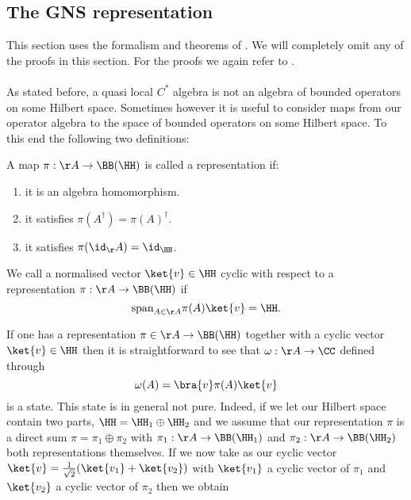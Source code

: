 \subsection{The GNS representation}\label{sec:the-gns-representation}
This section uses the formalism and theorems of \cite{bratteli1979operator}. We will completely omit any of the proofs in this section. For the proofs we again refer to \cite{bratteli1979operator}.\\\\
As stated before, a quasi local $C^*$ algebra is not an algebra of bounded operators on some Hilbert space. Sometimes however it is useful to consider maps from our operator algebra to the space of bounded operators on some Hilbert space. To this end the following two definitions:
\begin{definition}[representation]
	A map $\pi:\AA\rightarrow \BB(\HH)$ is called a representation if:
	\begin{enumerate}
		\item it is an algebra homomorphism.
		\item it satisfies $\pi(A^\dagger)=\pi(A)^\dagger$.
		\item it satisfies $\pi(\id_\AA)=\id_{\HH}$.
	\end{enumerate}
\end{definition}
\begin{definition}
	We call a normalised vector $\ket{v}\in\HH$ cyclic with respect to a representation $\pi:\AA\rightarrow \BB(\HH)$ if
	\begin{equation}
	\textrm{span}_{A\in\AA}\pi(A)\ket{v}=\HH.
	\end{equation}
\end{definition}
If one has a representation $\pi\in\AA\rightarrow\BB(\HH)$ together with a cyclic vector $\ket{v}\in\HH$ then it is straightforward to see that $\omega:\AA\rightarrow\CC$ defined through
\begin{equation}\label{eq:StateBelongingToRepresentation}
\omega(A)=\bra{v}\pi(A)\ket{v}
\end{equation}
is a state. This state is in general not pure. Indeed, if we let our Hilbert space contain two parts, $\HH=\HH_1\oplus\HH_2$ and we assume that our representation $\pi$ is a direct sum $\pi=\pi_1\oplus\pi_2$ with $\pi_1:\AA\rightarrow\BB(\HH_1)$ and $\pi_2:\AA\rightarrow\BB(\HH_2)$ both representations themselves. If we now take as our cyclic vector $\ket{v}=\frac{1}{\sqrt{2}}(\ket{v_1}+\ket{v_2})$ with $\ket{v_1}$ a cyclic vector of $\pi_1$ and $\ket{v_2}$ a cyclic vector of $\pi_2$ then we obtain

